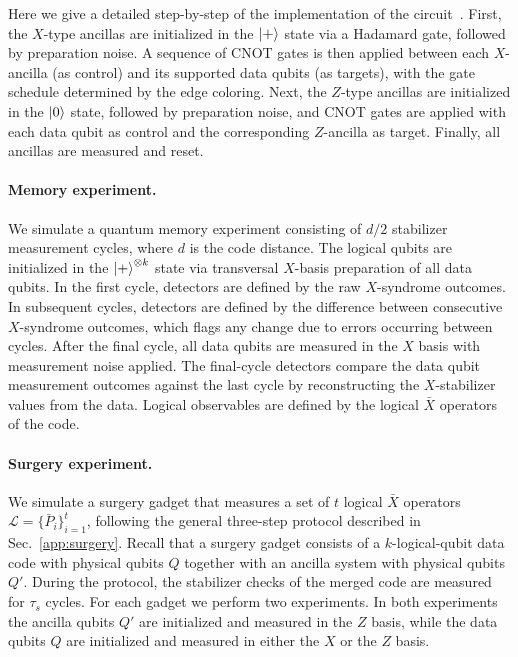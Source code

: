 \documentclass[reprint,twocolumn,secnumarabic,amssymb, aps, prx]{revtex4-2}
\newcommand{\taus}{\tau_s}
\begin{document}
Here we give a detailed step-by-step of the implementation of the circuit~\cite{tremblay2022constant, xu2024constant, gidney2021stim}. First, the $X$-type ancillas are initialized in the $\ket{+}$ state via a Hadamard gate, followed by preparation noise. A sequence of CNOT gates is then applied between each $X$-ancilla (as control) and its supported data qubits (as targets), with the gate schedule determined by the edge coloring. Next, the $Z$-type ancillas are initialized in the $\ket{0}$ state, followed by preparation noise, and CNOT gates are applied with each data qubit as control and the corresponding $Z$-ancilla as target. Finally, all ancillas are measured and reset.

\paragraph{Memory experiment.}
We simulate a quantum memory experiment consisting of $d/2$ stabilizer measurement cycles, where $d$ is the code distance. The logical qubits are initialized in the $\ket{+}^{\otimes k}$ state via transversal $X$-basis preparation of all data qubits. In the first cycle, detectors are defined by the raw $X$-syndrome outcomes. In subsequent cycles, detectors are defined by the difference between consecutive $X$-syndrome outcomes, which flags any change due to errors occurring between cycles. After the final cycle, all data qubits are measured in the $X$ basis with measurement noise applied. The final-cycle detectors compare the data qubit measurement outcomes against the last cycle by reconstructing the $X$-stabilizer values from the data. Logical observables are defined by the logical $\bar{X}$ operators of the code.

\paragraph{Surgery experiment. }
We simulate a surgery gadget that measures a set of $t$ logical $\bar{X}$ operators $\mathcal{L} = \{\bar{P}_i\}_{i=1}^t$, following the general three-step protocol described in Sec.~\ref{app:surgery}. Recall that a surgery gadget consists of a $k$-logical-qubit data code with physical qubits $Q$ together with an ancilla system with physical qubits $Q'$. During the protocol, the stabilizer checks of the merged code are measured for $\taus$ cycles. For each gadget we perform two experiments. In both experiments the ancilla qubits $Q'$ are initialized and measured in the $Z$ basis, while the data qubits $Q$ are initialized and measured in either the $X$ or the $Z$ basis.
\end{document}
